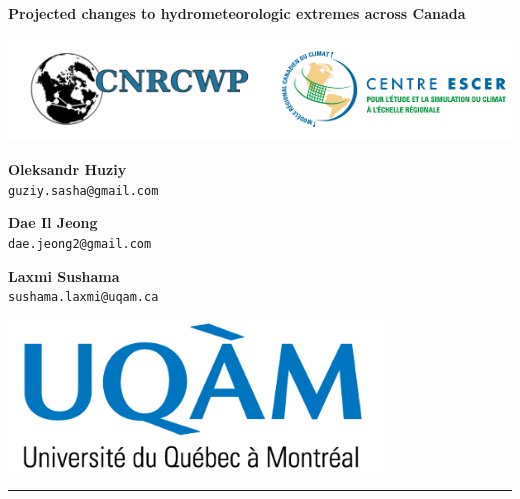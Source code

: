 \documentclass[a0,landscape]{a0poster}
\begin{document}


\noindent\begin{minipage}[b]{\linewidth}
\centering
\noindent \veryHuge \color{NavyBlue} \textbf{Projected changes to hydrometeorologic extremes across Canada} \color{Black}\\ %
\noindent\begin{minipage}[c]{0.2\linewidth}
      \center
      \includegraphics[width=25cm]{logo_cnrcwp_escer.png} %
\end{minipage} \hfill
%
\begin{minipage}[c]{0.15\linewidth}
  \center
  \Large \textbf{Oleksandr Huziy} \\
  \large \texttt{guziy.sasha@gmail.com}
\end{minipage}\hfill
%
\begin{minipage}[b]{0.01\linewidth}
 \center
\end{minipage}
%
\begin{minipage}[c]{0.15\linewidth}
   \center
   \Large \textbf{Dae Il Jeong} \\
   \large  \texttt{dae.jeong2@gmail.com}
\end{minipage}\hfill
%
\begin{minipage}[b]{0.01\linewidth}
 \center
\end{minipage}
%
\begin{minipage}[c]{0.15\linewidth}
   \center
   \Large \textbf{Laxmi Sushama} \\
   \large  \texttt{sushama.laxmi@uqam.ca}
\end{minipage}\hfill
%
\begin{minipage}[c]{0.2\linewidth}
  \center
  \includegraphics[width=10cm]{logo_uqam.png} %
\end{minipage}
\rule{\linewidth}{3pt}
\end{minipage}
%
\end{document}
